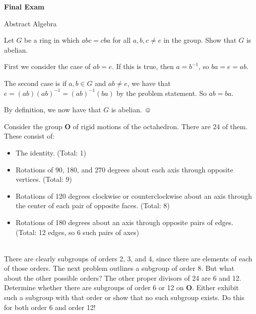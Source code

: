 \documentclass[12pt]{exam}
\newcommand{\announce}[1]
{\vspace\baselineskip{\parindent0in {\bf #1}}}
\begin{document}
\pagestyle{empty}

{\parindent0in

\begin{center}
\huge \bf Final Exam
\end{center}

\hfill
Abstract Algebra
\hfill
{}
}

\begin{questions}

\question Let $G$ be a ring in which $abc = cba$ for all $a, b, c \neq e$ in the group.  Show that $G$ is abelian.

\announce{Solution 1:} First we consider the case of $ab = e$. If this is true, then $a = b^{-1}$, so $ba = e = ab$. 

The second case is if $a,b \in G$ and $ab \neq e$, we have that $e = (ab)(ab)^{-1} = (ab)^{-1}(ba)$ by the problem statement. So $ab = ba$. 

By definition, we now have that $G$ is abelian. $\smiley$ 

\vspace{1cm}

\begin{minipage}[t]{5in}
\question Consider the group $\mathbf O$ of rigid motions of the octahedron.  There are 24 of them.  These consist of:
\begin{itemize}
\item The identity. (Total: 1)
\item Rotations of 90, 180, and 270 degrees about each axis through opposite vertices.  (Total: 9)
\item Rotations of 120 degrees clockwise or counterclockwise about an axis through the center of each pair of opposite faces.  (Total: 8)
\item Rotations of 180 degrees about an axis through opposite pairs of edges.  (Total: 12 edges, so 6 such pairs of axes)
\end{itemize}
\vspace{\itemsep}
\end{minipage}
\begin{minipage}[t]{1in} \vspace{0in}
\end{minipage}\\
There are clearly subgroups of orders 2, 3, and 4, since there are elements of each of those orders.  The next problem outlines a subgroup of order 8.  But what about the other possible orders?  The other proper divisors of 24 are 6 and 12.  Determine whether there are subgroups of order 6 or 12 on $\mathbf O$.  Either exhibit such a subgroup with that order or show that no such subgroup exists.  Do this for both order 6 and order 12!


\end{questions}
\end{document}
